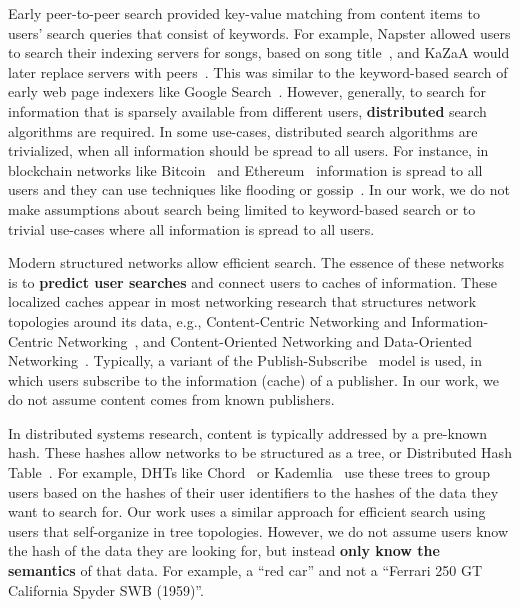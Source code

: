 \documentclass[10pt,journal]{IEEEtran}
\begin{document}
Early peer-to-peer search provided key-value matching from content items to users' search queries that consist of keywords.
For example, Napster allowed users to search their indexing servers for songs, based on song title~\cite{carlsson2001rise}, and
KaZaA would later replace servers with peers~\cite{liang2005kazaa}.
This was similar to the keyword-based search of early web page indexers like Google Search~\cite{brin1998anatomy}.
However, generally, to search for information that is sparsely available from different users, \textbf{distributed} search algorithms are required.
In some use-cases, distributed search algorithms are trivialized, when all information should be spread to all users.
For instance, in blockchain networks like Bitcoin~\cite{nakamoto2008bitcoin} and Ethereum~\cite{wood2014ethereum} information is spread to all users and they can use techniques like flooding or gossip~\cite{vansteen2018distributed}. In our work, we do not make assumptions about search being limited to keyword-based search or to trivial use-cases where all information is spread to all users.

Modern structured networks allow efficient search.
The essence of these networks is to \textbf{predict user searches} and connect users to caches of information.
These localized caches appear in most networking research that structures network topologies around its data, e.g., Content-Centric Networking and Information-Centric Networking~\cite{vasilakos2015information}, and Content-Oriented Networking and Data-Oriented Networking~\cite{cho2008content}.
Typically, a variant of the Publish-Subscribe~\cite{vansteen2018distributed} model is used, in which users subscribe to the information (cache) of a publisher.
In our work, we do not assume content comes from known publishers.

In distributed systems research, content is typically addressed by a pre-known hash.
These hashes allow networks to be structured as a tree, or Distributed Hash Table~\cite{vansteen2018distributed}.
For example, DHTs like Chord~\cite{stoica2003chord} or Kademlia~\cite{maymounkov2002kademlia} use these trees to group users based on the hashes of their user identifiers to the hashes of the data they want to search for.
Our work uses a similar approach for efficient search using users that self-organize in tree topologies.
However, we do not assume users know the hash of the data they are looking for, but instead \textbf{only know the semantics} of that data.
For example, a ``red car'' and not a ``Ferrari 250 GT California Spyder SWB (1959)''.
\end{document}
